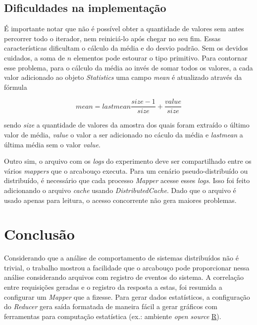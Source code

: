 \documentclass[brazil, a4paper,12pt]{article}
\begin{document}
\subsection {Dificuldades na implementação}

É importante notar que não é possível obter a quantidade de valores sem antes
percorrer todo o iterador, nem reiniciá-lo após chegar no seu fim. Essas
características dificultam o cálculo da média e do desvio padrão. Sem os
devidos cuidados, a soma de $n$ elementos pode estourar o tipo primitivo. Para
contornar esse problema, para o cálculo da média ao invés de somar todos os
valores, a cada valor adicionado ao objeto \emph{Statistics} uma campo
\emph{mean} é atualizado através da fórmula

\[
mean = lastmean \frac{size-1}{size} + \frac{value}{size}
\]

\noindent sendo \emph{size} a quantidade de valores da amostra dos quais foram
extraído o último valor de média, \emph{value} o valor a ser adicionado no
cáculo da média e \emph{lastmean} a última média sem o valor \emph{value}.

Outro sim, o arquivo com os \emph{logs} do experimento deve ser compartilhado
entre os vários \emph{mappers} que o arcabouço executa. Para um cenário
pseudo-distribuído ou distribuído, é necessário que cada processo \emph{Mapper}
acesse esses \emph{logs}. Isso foi feito adicionando o arquivo \emph{cache}
usando \emph{DistributedCache}. Dado que o arquivo é usado apenas para leitura,
       o acesso concorrente não gera maiores problemas.

\section {Conclusão}

Considerando que a análise de comportamento de sistemas distribuídos não é
trivial, o trabalho mostrou a facilidade que o arcabouço pode proporcionar
nessa análise considerando arquivos com registro de eventos do sistema. A
correlação entre requisições geradas e o registro da resposta a estas, foi
resumida a configurar um \emph{Mapper} que a fizesse. Para gerar dados
estatísticos, a configuração do \emph{Reducer} gera saída formatada de maneira
fácil a gerar gráficos com ferramentas para computação estatística (ex.:
    ambiente \textit{open source} \href{http://www.r-project.org/}{R}).
\end{document}
